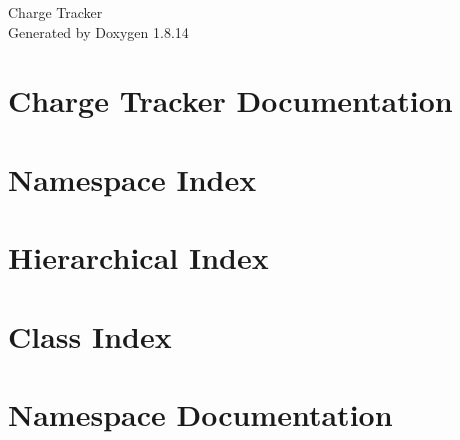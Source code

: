 \documentclass[twoside]{book}
\newcommand{\+}{\discretionary{\mbox{\scriptsize$\hookleftarrow$}}{}{}}
\newcommand{\clearemptydoublepage}{%
  \newpage{\pagestyle{empty}\cleardoublepage}%
}
\begin{document}
\hypersetup{pageanchor=false,
             bookmarksnumbered=true,
             pdfencoding=unicode
            }
\begin{titlepage}
\vspace*{7cm}
\begin{center}%
{\Large Charge Tracker }\\
\vspace*{1cm}
{\large Generated by Doxygen 1.8.14}\\
\end{center}
\end{titlepage}
\clearemptydoublepage
{}
\tableofcontents
\clearemptydoublepage
{}
\hypersetup{pageanchor=true}

\chapter{Charge Tracker Documentation}
\label{index}\hypertarget{index}{}
\chapter{Namespace Index}

\chapter{Hierarchical Index}

\chapter{Class Index}

\chapter{Namespace Documentation}






















\end{document}
